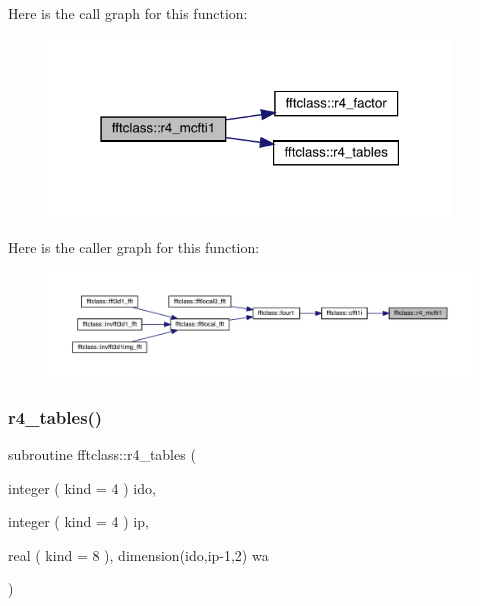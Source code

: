 Here is the call graph for this function\+:\nopagebreak
\begin{figure}[H]
\begin{center}
\leavevmode
\includegraphics[width=303pt]{namespacefftclass_aecf4238ff306578dd37cab143ce6efac_cgraph}
\end{center}
\end{figure}
Here is the caller graph for this function\+:\nopagebreak
\begin{figure}[H]
\begin{center}
\leavevmode
\includegraphics[width=350pt]{namespacefftclass_aecf4238ff306578dd37cab143ce6efac_icgraph}
\end{center}
\end{figure}
\mbox{\label{namespacefftclass_a882cd8d6eeb407d2b10ee9b3d9fee8b9}} 
\subsubsection{\texorpdfstring{r4\_tables()}{r4\_tables()}}
{\footnotesize\ttfamily subroutine fftclass\+::r4\+\_\+tables (\begin{DoxyParamCaption}\item[{integer ( kind = 4 )}]{ido,  }\item[{integer ( kind = 4 )}]{ip,  }\item[{real ( kind = 8 ), dimension(ido,ip-\/1,2)}]{wa }\end{DoxyParamCaption})}

